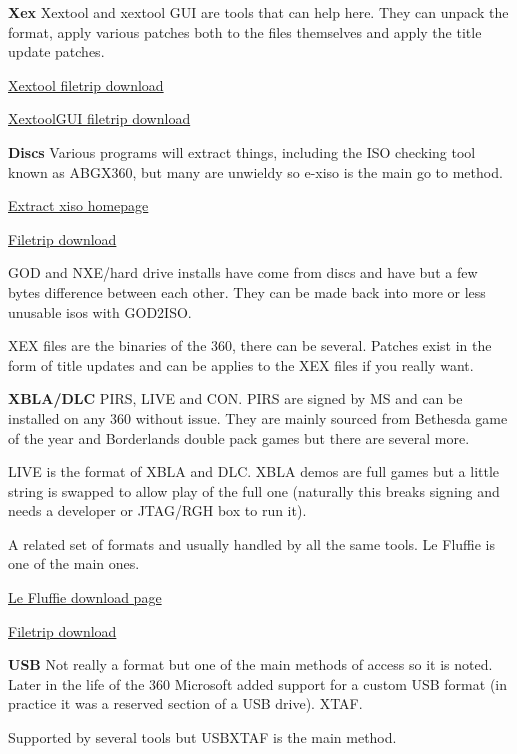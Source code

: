 \documentclass[
]{book}
\begin{document}
\textbf{Xex} Xextool and xextool GUI are tools that can help here. They can unpack the format, apply various patches both to the files themselves and apply the title update patches.

\href{http://filetrip.net/360-downloads/iso-tools/latest-xextool-f29383.html}{Xextool filetrip download}

\href{http://filetrip.net/360-downloads/iso-tools/latest-xextool-gui-f29384.html}{XextoolGUI filetrip download}

\textbf{Discs} Various programs will extract things, including the ISO checking tool known as ABGX360, but many are unwieldy so e-xiso is the main go to method.

\href{http://alecsis.free.fr/Extract-xiso/}{Extract xiso homepage}

\href{http://filetrip.net/360-downloads/iso-tools/download-e-xisogui-1007-f28976.html}{Filetrip download}

GOD and NXE/hard drive installs have come from discs and have but a few bytes difference between each other. They can be made back into more or less unusable isos with GOD2ISO.

XEX files are the binaries of the 360, there can be several. Patches exist in the form of title updates and can be applies to the XEX files if you really want.

\textbf{XBLA/DLC} PIRS, LIVE and CON. PIRS are signed by MS and can be installed on any 360 without issue. They are mainly sourced from Bethesda game of the year and Borderlands double pack games but there are several more.

LIVE is the format of XBLA and DLC. XBLA demos are full games but a little string is swapped to allow play of the full one (naturally this breaks signing and needs a developer or JTAG/RGH box to run it).

A related set of formats and usually handled by all the same tools. Le Fluffie is one of the main ones.

\href{http://skunkiebutt.com/?page_id=362}{Le Fluffie download page}

\href{http://filetrip.net/360-downloads/other-files/download-le-fluffie-690025-f28975.html}{Filetrip download}

\textbf{USB} Not really a format but one of the main methods of access so it is noted. Later in the life of the 360 Microsoft added support for a custom USB format (in practice it was a reserved section of a USB drive). XTAF.

Supported by several tools but USBXTAF is the main method.
\end{document}
